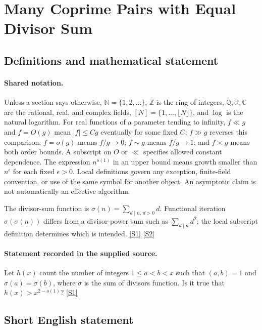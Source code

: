 \documentclass[11pt,a4paper]{article}
\newcommand{\N}{\mathbb{N}}
\newcommand{\Z}{\mathbb{Z}}
\newcommand{\Q}{\mathbb{Q}}
\newcommand{\R}{\mathbb{R}}
\newcommand{\C}{\mathbb{C}}
\newcommand{\sref}[2]{\hyperlink{source:#1:#2}{[S#2]}}
\begin{document}
\section{Many Coprime Pairs with Equal Divisor Sum}\label{statement}


\subsection{Definitions and mathematical statement}

\paragraph{Shared notation.}Unless a section says otherwise, $\N=\{1,2,\ldots\}$,
$\Z$ is the ring of integers, $\Q,\R,\C$ are the rational, real, and complex
fields, $[N]=\{1,\ldots,\lfloor N\rfloor\}$, and $\log$ is the natural
logarithm. For real functions of a parameter tending to infinity,
$f\ll g$ and $f=O(g)$ mean $|f|\leq Cg$ eventually for some fixed $C$;
$f\gg g$ reverses this comparison; $f=o(g)$ means $f/g\to0$;
$f\sim g$ means $f/g\to1$; and $f\asymp g$ means both order bounds.
A subscript on $O$ or $\ll$ specifies allowed constant dependence.
The expression $n^{o(1)}$ in an upper bound means growth smaller than
$n^\epsilon$ for each fixed $\epsilon>0$. Local definitions govern any
exception, finite-field convention, or use of the same symbol for another
object. An asymptotic claim is not automatically an effective algorithm.



The divisor-sum function is $\sigma(n)=\sum_{d\mid n,\,d>0}d$. Functional iteration $\sigma(\sigma(n))$ differs from a divisor-power sum such as $\sum_{d\mid n}d^2$; the local subscript definition determines which is intended. \sref{statement}{1} \sref{statement}{2}

\paragraph{Statement recorded in the supplied source.}
Let $h(x)$ count the number of integers $1\leq a<b<x$ such that $(a,b)=1$ and $\sigma(a)=\sigma(b)$, where $\sigma$ is the sum of divisors function.
Is it true that $h(x)>x^{2-o(1)}$? \sref{statement}{1}

\subsection{Short English statement}
\end{document}
